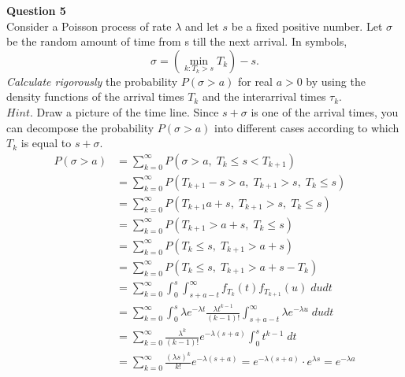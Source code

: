 \documentclass[12pt]{article}
\begin{document}
\newpage
\textbf{Question 5}\\
Consider a Poisson process of rate $\lambda$ and let $s$ be a fixed positive number. Let $\sigma$ be the
random amount of time from s till the next arrival. In symbols,
$$\sigma = \left(\min\limits_{k:T_k>s} T_k\right) - s.$$
{\sl Calculate rigorously} the probability $P(\sigma>a)$ for real $a>0$ by using the density functions of the arrival times $T_k$ and the interarrival times $\tau_k$.\\
$Hint.$ Draw a picture of the time line. Since $s+\sigma$ is one of the arrival times, you can decompose the probability $P(\sigma>a)$ into different cases according to which $T_k$ is equal to $s+\sigma$.
\begin{align}
    P(\sigma > a) &= \sum\limits_{k=0}^\infty P(\sigma>a,\; T_k\le s<T_{k+1}) \nonumber\\
    &=\sum\limits_{k=0}^\infty P(T_{k+1}-s>a,\; T_{k+1}>s,\; T_k\le s)\nonumber\\
    &=\sum\limits_{k=0}^\infty P(T_{k+1}a+s,\;T_{k+1}>s,\;T_k\le s)\nonumber\\
    &=\sum\limits_{k=0}^\infty P(T_{k+1}>a+s,\; T_k\le s)\nonumber\\
    &=\sum\limits_{k=0}^\infty P(T_k \le s,\; T_{k+1}>a+s)\nonumber\\
    &=\sum\limits_{k=0}^\infty P(T_k\le s,\; T_{k+1}>a+s - T_k)\nonumber \\
    &=\sum\limits_{k=0}^\infty \int_0^s\int_{s+a-t}^\infty f_{T_k}(t) f_{T_{k+1}} (u)\;dudt\nonumber\\
    &=\sum\limits_{k=0}^\infty\int_0^s \lambda e^{-\lambda t} \frac{\lambda t^{k-1}}{(k-1)!} 
    \int_{s+a-t}^\infty \lambda e^{-\lambda u}\;dudt\nonumber\\
    &=\sum\limits_{k=0}^\infty \frac{\lambda^k}{(k-1)!} e^{-\lambda(s+a)}\int_0^s t^{k-1}\;dt\nonumber\\
    &=\sum\limits_{k=0}^\infty \frac{(\lambda s)^k}{k!} e^{-\lambda (s+a)} = e^{-\lambda (s+a)}\cdot e^{\lambda s} = e^{-\lambda a}\nonumber
\end{align}
\end{document}
